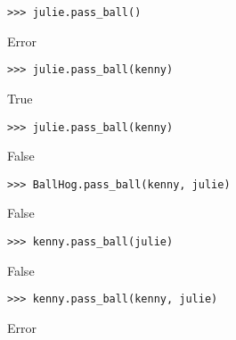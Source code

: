 \begin{blocksection}
\begin{lstlisting}
>>> julie.pass_ball()
\end{lstlisting}
\begin{solution}[.2in]
Error
\end{solution}

\begin{lstlisting}
>>> julie.pass_ball(kenny)
\end{lstlisting}
\begin{solution}[.2in]
True
\end{solution}

\begin{lstlisting}
>>> julie.pass_ball(kenny)
\end{lstlisting}
\begin{solution}[.2in]
False
\end{solution}

\begin{lstlisting}
>>> BallHog.pass_ball(kenny, julie)
\end{lstlisting}
\begin{solution}[.2in]
False
\end{solution}

\begin{lstlisting}
>>> kenny.pass_ball(julie)
\end{lstlisting}
\begin{solution}[.2in]
False
\end{solution}

\begin{lstlisting}
>>> kenny.pass_ball(kenny, julie)
\end{lstlisting}
\begin{solution}[.2in]
Error
\end{solution}
\end{blocksection}
